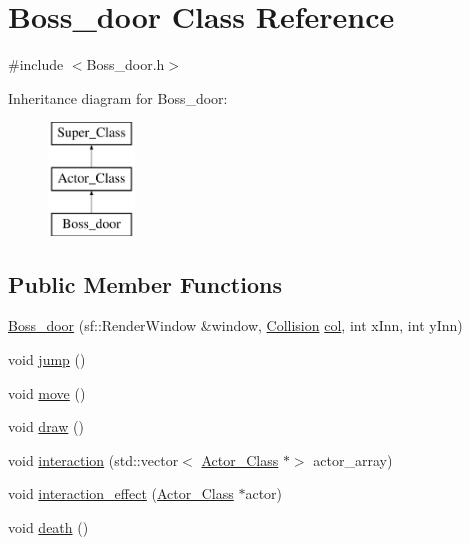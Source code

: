 \hypertarget{class_boss__door}{}\section{Boss\+\_\+door Class Reference}
\label{class_boss__door}


{\ttfamily \#include $<$Boss\+\_\+door.\+h$>$}

Inheritance diagram for Boss\+\_\+door\+:\begin{figure}[H]
\begin{center}
\leavevmode
\includegraphics[height=3.000000cm]{class_boss__door}
\end{center}
\end{figure}
\subsection*{Public Member Functions}
\begin{DoxyCompactItemize}
\item 
\hyperlink{class_boss__door_a9714a08a688e8dc4819db1ade1d502fd}{Boss\+\_\+door} (sf\+::\+Render\+Window \&window, \hyperlink{class_collision}{Collision} \hyperlink{class_boss__door_a591dd5dd3815c47b2f8390fe63953ac2}{col}, int x\+Inn, int y\+Inn)
\item 
void \hyperlink{class_boss__door_ac2f0b88b5ca332380602f029f0f83e17}{jump} ()
\item 
void \hyperlink{class_boss__door_a27456c378555a03310cd4f25b167867c}{move} ()
\item 
void \hyperlink{class_boss__door_a093ca3c013ae4f5f703675bc6d3de9f0}{draw} ()
\item 
void \hyperlink{class_boss__door_ab80f398f1c479f78c2b36409c311ccb5}{interaction} (std\+::vector$<$ \hyperlink{class_actor___class}{Actor\+\_\+\+Class} $\ast$$>$ actor\+\_\+array)
\item 
void \hyperlink{class_boss__door_ab47df13fb29b88a5be09fb7062384a50}{interaction\+\_\+effect} (\hyperlink{class_actor___class}{Actor\+\_\+\+Class} $\ast$actor)
\item 
void \hyperlink{class_boss__door_acee93d541699ed109dfae8f05f0ea39e}{death} ()
\end{DoxyCompactItemize}

